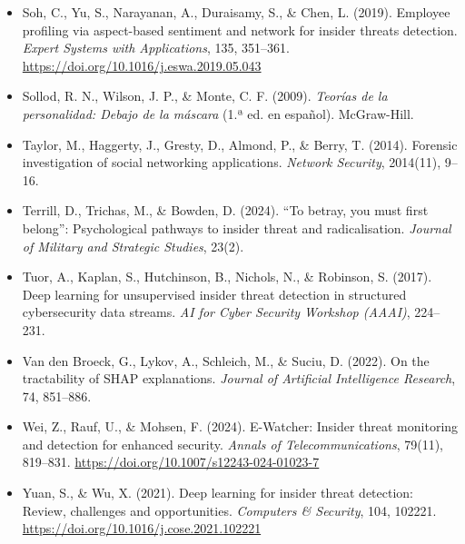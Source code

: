 \documentclass[IB]{TFUOC}%
\begin{document}
\begin{itemize}
    \item Soh, C., Yu, S., Narayanan, A., Duraisamy, S., \& Chen, L. (2019). 
    Employee profiling via aspect-based sentiment and network for insider 
    threats detection. \textit{Expert Systems with Applications}, 135, 
    351--361. \url{https://doi.org/10.1016/j.eswa.2019.05.043}

    \item Sollod, R. N., Wilson, J. P., \& Monte, C. F. (2009). 
    \textit{Teorías de la personalidad: Debajo de la máscara} (1.ª ed. en 
    español). McGraw-Hill.

    \item Taylor, M., Haggerty, J., Gresty, D., Almond, P., \& Berry, T. 
    (2014). Forensic investigation of social networking applications. 
    \textit{Network Security}, 2014(11), 9--16.

    \item Terrill, D., Trichas, M., \& Bowden, D. (2024). ``To betray, you 
    must first belong'': Psychological pathways to insider threat and 
    radicalisation. \textit{Journal of Military and Strategic Studies}, 
    23(2).

    \item Tuor, A., Kaplan, S., Hutchinson, B., Nichols, N., \& Robinson, S. 
    (2017). Deep learning for unsupervised insider threat detection in 
    structured cybersecurity data streams. \textit{AI for Cyber Security 
    Workshop (AAAI)}, 224--231.

    \item Van den Broeck, G., Lykov, A., Schleich, M., \& Suciu, D. (2022). 
    On the tractability of SHAP explanations. \textit{Journal of Artificial 
    Intelligence Research}, 74, 851--886.

    \item Wei, Z., Rauf, U., \& Mohsen, F. (2024). E-Watcher: Insider threat 
    monitoring and detection for enhanced security. \textit{Annals of 
    Telecommunications}, 79(11), 819--831. 
    \url{https://doi.org/10.1007/s12243-024-01023-7}

    \item Yuan, S., \& Wu, X. (2021). Deep learning for insider threat 
    detection: Review, challenges and opportunities. \textit{Computers \& 
    Security}, 104, 102221. 
    \url{https://doi.org/10.1016/j.cose.2021.102221}

\end{itemize}
\end{document}
